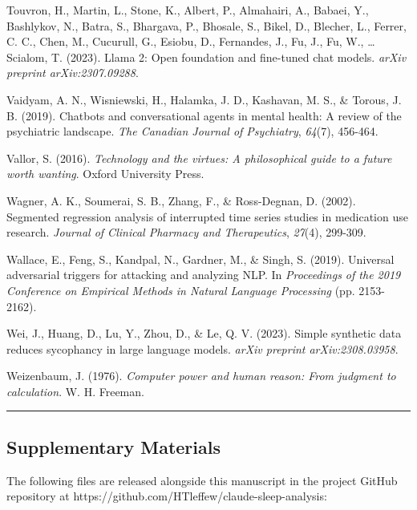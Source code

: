 \documentclass[11pt]{article}
\begin{document}
Touvron, H., Martin, L., Stone, K., Albert, P., Almahairi, A., Babaei, Y., Bashlykov, N., Batra, S., Bhargava, P., Bhosale, S., Bikel, D., Blecher, L., Ferrer, C. C., Chen, M., Cucurull, G., Esiobu, D., Fernandes, J., Fu, J., Fu, W., \ldots{} Scialom, T. (2023). Llama 2: Open foundation and fine-tuned chat models. \emph{arXiv preprint arXiv:2307.09288}.

Vaidyam, A. N., Wisniewski, H., Halamka, J. D., Kashavan, M. S., \& Torous, J. B. (2019). Chatbots and conversational agents in mental health: A review of the psychiatric landscape. \emph{The Canadian Journal of Psychiatry}, \emph{64}(7), 456-464.

Vallor, S. (2016). \emph{Technology and the virtues: A philosophical guide to a future worth wanting}. Oxford University Press.

Wagner, A. K., Soumerai, S. B., Zhang, F., \& Ross-Degnan, D. (2002). Segmented regression analysis of interrupted time series studies in medication use research. \emph{Journal of Clinical Pharmacy and Therapeutics}, \emph{27}(4), 299-309.

Wallace, E., Feng, S., Kandpal, N., Gardner, M., \& Singh, S. (2019). Universal adversarial triggers for attacking and analyzing NLP. In \emph{Proceedings of the 2019 Conference on Empirical Methods in Natural Language Processing} (pp. 2153-2162).

Wei, J., Huang, D., Lu, Y., Zhou, D., \& Le, Q. V. (2023). Simple synthetic data reduces sycophancy in large language models. \emph{arXiv preprint arXiv:2308.03958}.

Weizenbaum, J. (1976). \emph{Computer power and human reason: From judgment to calculation}. W. H. Freeman.

\bigskip\hrule\bigskip

\subsection{Supplementary Materials}

The following files are released alongside this manuscript in the project GitHub repository at https://github.com/HTleffew/claude-sleep-analysis:
\end{document}
